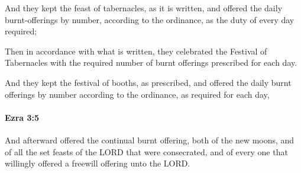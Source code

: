			\begin{versebox}
					\item[BHS] 
					\item[LXX] 
					\item[ASV] And they kept the feast of tabernacles, as it is written, and offered the daily burnt-offerings by number, according to the ordinance, as the duty of every day required;
					\item[NIV] Then in accordance with what is written, they celebrated the Festival of Tabernacles with the required number of burnt offerings prescribed for each day.
					\item[NRSV] And they kept the festival of booths, as prescribed, and offered the daily burnt offerings by number according to the ordinance, as required for each day,
			\end{versebox}

		\paragraph{Ezra 3:5} %
			\label{EZRA-3-5}

			And afterward offered the continual burnt offering, both of the new moons, and of all the set feasts of the LORD that were consecrated, and of every one that willingly offered a freewill offering unto the LORD.

